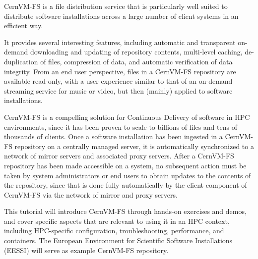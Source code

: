 CernVM-FS is a file distribution service that is particularly well suited to distribute software installations across a large number of client systems in an efficient way.

It provides several interesting features, including automatic and transparent on-demand downloading and updating of repository contents, multi-level caching, de-duplication of files, compression of data, and automatic verification of data integrity.
From an end user perspective, files in a CernVM-FS repository are available read-only, with a user experience similar to that of an on-demand streaming service for music or video, but then (mainly) applied to software installations.

CernVM-FS is a compelling solution for Continuous Delivery of software in HPC environments, since it has been proven to scale to billions of files and tens of thousands of clients. Once a software installation has been ingested in a CernVM-FS repository on a centrally managed server, it is
automatically synchronized to a network of mirror servers and associated proxy servers.
After a CernVM-FS repository has been made accessible on a system, no subsequent action must be taken by system administrators or end users to obtain updates to the contents of the repository, since that is done fully automatically by the client component of CernVM-FS via the network of mirror and proxy servers.

This tutorial will introduce CernVM-FS through hands-on exercises and demos, and cover specific aspects that are relevant to using it in an HPC context, including HPC-specific configuration, troubleshooting, performance, and containers. The European Environment for Scientific Software
Installations (EESSI) will serve as example CernVM-FS repository.



